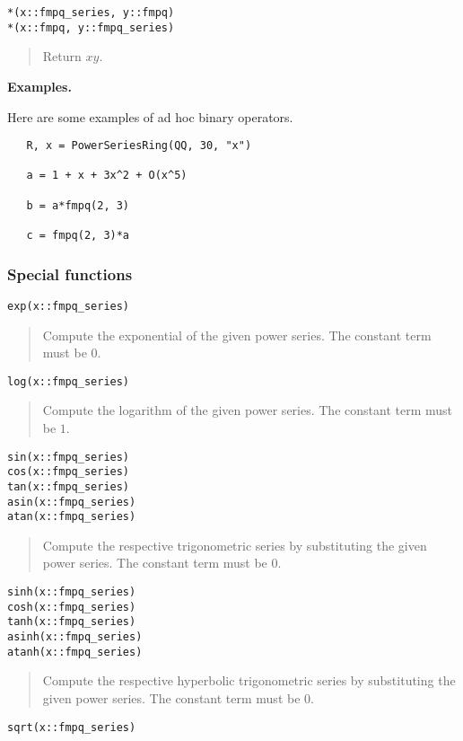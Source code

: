 \documentclass[a4paper,10pt]{article}
\newcommand{\desc}[1]{\vspace{-3mm}\begin{quote}#1\end{quote}}
\begin{document}
{{\begin{lstlisting}
*(x::fmpq_series, y::fmpq)
*(x::fmpq, y::fmpq_series)
\end{lstlisting}

\desc{Return $xy$.}

\textbf{Examples.}

Here are some examples of ad hoc binary operators.

\begin{lstlisting}
   R, x = PowerSeriesRing(QQ, 30, "x")

   a = 1 + x + 3x^2 + O(x^5)
   
   b = a*fmpq(2, 3)

   c = fmpq(2, 3)*a
\end{lstlisting}

\subsubsection{Special functions}

\begin{lstlisting}
exp(x::fmpq_series)
\end{lstlisting}

\desc{Compute the exponential of the given power series. The constant term must be $0$.}

\begin{lstlisting}
log(x::fmpq_series)
\end{lstlisting}

\desc{Compute the logarithm of the given power series. The constant term must be $1$.}

\begin{lstlisting}
sin(x::fmpq_series)
cos(x::fmpq_series)
tan(x::fmpq_series)
asin(x::fmpq_series)
atan(x::fmpq_series)
\end{lstlisting}

\desc{Compute the respective trigonometric series by substituting the given power series.
The constant term must be $0$.}

\begin{lstlisting}
sinh(x::fmpq_series)
cosh(x::fmpq_series)
tanh(x::fmpq_series)
asinh(x::fmpq_series)
atanh(x::fmpq_series)
\end{lstlisting}

\desc{Compute the respective hyperbolic trigonometric series by substituting the given power
series. The constant term must be $0$.}

\begin{lstlisting}
sqrt(x::fmpq_series)
\end{lstlisting}

}}
\end{document}
